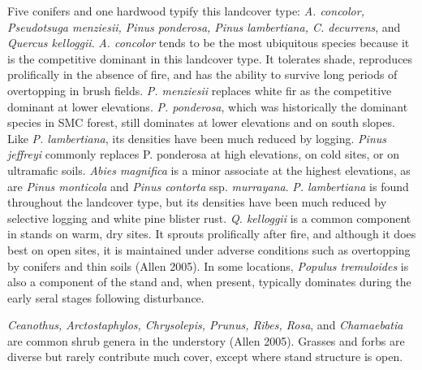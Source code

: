 Five conifers and one hardwood typify this landcover type: \emph{A. concolor, Pseudotsuga menziesii, Pinus ponderosa, Pinus lambertiana, C. decurrens}, and \emph{Quercus kelloggii}. \emph{A. concolor} tends to be the most ubiquitous species because it is the competitive dominant in this landcover type. It tolerates shade, reproduces prolifically in the absence of fire, and has the ability to survive long periods of overtopping in brush fields. \emph{P. menziesii} replaces white fir as the competitive dominant at lower elevations. \emph{P. ponderosa}, which was historically the dominant species in SMC forest, still dominates at lower elevations and on south slopes. Like \emph{P. lambertiana}, its densities have been much reduced by logging. \emph{Pinus jeffreyi} commonly replaces P. ponderosa at high elevations, on cold sites, or on ultramafic soils. \emph{Abies magnifica} is a minor associate at the highest elevations, as are \emph{Pinus monticola} and \emph{Pinus contorta} ssp. \emph{murrayana}. \emph{P. lambertiana} is found throughout the landcover type, but its densities have been much reduced by selective logging and white pine blister rust. \emph{Q. kelloggii} is a common component in stands on warm, dry sites. It sprouts prolifically after fire, and although it does best on open sites, it is maintained under adverse conditions such as overtopping by conifers and thin soils (Allen 2005). In some locations, \emph{Populus tremuloides} is also a component of the stand and, when present, typically dominates during the early seral stages following disturbance.

\emph{Ceanothus, Arctostaphylos, Chrysolepis, Prunus, Ribes, Rosa}, and \emph{Chamaebatia} are common shrub genera in the understory (Allen 2005). Grasses and forbs are diverse but rarely contribute much cover, except where stand structure is open. 


